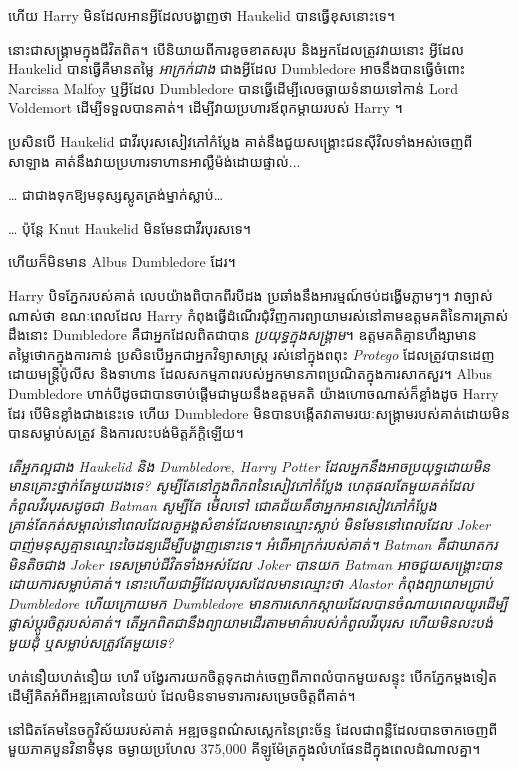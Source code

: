 ហើយ Harry មិនដែលអានអ្វីដែលបង្ហាញថា Haukelid បានធ្វើខុសនោះទេ។

នោះជាសង្រ្គាមក្នុងជីវិតពិត។ បើនិយាយពីការខូចខាតសរុប និងអ្នកដែលត្រូវវាយនោះ អ្វីដែល Haukelid បានធ្វើគឺមានតម្លៃ \emph{ អាក្រក់ជាង } ជាងអ្វីដែល Dumbledore អាចនឹងបានធ្វើចំពោះ Narcissa Malfoy ឬអ្វីដែល Dumbledore បានធ្វើដើម្បីលេចធ្លាយទំនាយទៅកាន់ Lord Voldemort ដើម្បីទទួលបានគាត់។ ដើម្បីវាយប្រហារឪពុកម្តាយរបស់ Harry ។

ប្រសិនបើ Haukelid ជាវីរបុរសសៀវភៅកំប្លែង គាត់នឹងជួយសង្គ្រោះជនស៊ីវិលទាំងអស់ចេញពីសាឡាង គាត់នឹងវាយប្រហារទាហានអាល្លឺម៉ង់ដោយផ្ទាល់...

… ជាជាងទុកឱ្យមនុស្សស្លូតត្រង់ម្នាក់ស្លាប់…

… ប៉ុន្តែ Knut Haukelid មិនមែនជាវីរបុរសទេ។

ហើយក៏មិនមាន Albus Dumbledore ដែរ។

Harry បិទភ្នែករបស់គាត់ លេបយ៉ាងពិបាកពីរបីដង ប្រឆាំងនឹងអារម្មណ៍ថប់ដង្ហើមភ្លាមៗ។ វាច្បាស់ណាស់ថា ខណៈពេលដែល Harry កំពុងធ្វើដំណើរជុំវិញការព្យាយាមរស់នៅតាមឧត្តមគតិនៃការត្រាស់ដឹងនោះ Dumbledore គឺជាអ្នកដែលពិតជាបាន \emph{ប្រយុទ្ធក្នុងសង្គ្រាម}។ ឧត្តមគតិគ្មានហឹង្សាមានតម្លៃថោកក្នុងការកាន់ ប្រសិនបើអ្នកជាអ្នកវិទ្យាសាស្ត្រ រស់នៅក្នុងពពុះ \emph{Protego} ដែលត្រូវបានដេញដោយមន្ត្រីប៉ូលីស និងទាហាន ដែលសកម្មភាពរបស់អ្នកមានភាពប្រណិតក្នុងការសាកសួរ។ Albus Dumbledore ហាក់បីដូចជាបានចាប់ផ្តើមជាមួយនឹងឧត្តមគតិ យ៉ាងហោចណាស់ក៏ខ្លាំងដូច Harry ដែរ បើមិនខ្លាំងជាងនេះទេ ហើយ Dumbledore មិន​បាន​បង្កើត​វា​តាម​រយៈ​សង្រ្គាម​របស់​គាត់​ដោយ​មិន​បាន​សម្លាប់​សត្រូវ និង​ការ​លះបង់​មិត្តភ័ក្ដិ​ឡើយ។

\emph{តើអ្នកល្អជាង Haukelid និង Dumbledore, Harry Potter ដែលអ្នកនឹងអាចប្រយុទ្ធដោយមិនមានគ្រោះថ្នាក់តែមួយដងទេ? សូម្បីតែនៅក្នុងពិភពនៃសៀវភៅកំប្លែង ហេតុផលតែមួយគត់ដែលកំពូលវីរបុរសដូចជា Batman សូម្បីតែ \emph{មើលទៅ} ជោគជ័យគឺថាអ្នកអានសៀវភៅកំប្លែងគ្រាន់តែកត់សម្គាល់នៅពេលដែលតួអង្គសំខាន់ដែលមានឈ្មោះស្លាប់ មិនមែននៅពេលដែល Joker បាញ់មនុស្សគ្មានឈ្មោះចៃដន្យដើម្បីបង្ហាញនោះទេ។ អំពើអាក្រក់របស់គាត់។ Batman គឺជាឃាតករមិនតិចជាង Joker ទេសម្រាប់ជីវិតទាំងអស់ដែល Joker បានយក Batman អាចជួយសង្គ្រោះបានដោយការសម្លាប់គាត់។ នោះហើយជាអ្វីដែលបុរសដែលមានឈ្មោះថា Alastor កំពុងព្យាយាមប្រាប់ Dumbledore ហើយក្រោយមក Dumbledore មានការសោកស្ដាយដែលបានចំណាយពេលយូរដើម្បីផ្លាស់ប្តូរចិត្តរបស់គាត់។ តើ​អ្នក​ពិត​ជា​នឹង​ព្យាយាម​ដើរ​តាម​មាគ៌ា​របស់​កំពូល​វីរបុរស ហើយ​មិន​លះបង់​មួយ​ដុំ ឬ​សម្លាប់​សត្រូវ​តែ​មួយ​ទេ?}

ហត់នឿយហត់នឿយ ហេរី បង្វែរការយកចិត្តទុកដាក់ចេញពីភាពលំបាកមួយសន្ទុះ បើកភ្នែកម្តងទៀតដើម្បីគិតអំពីអឌ្ឍគោលនៃយប់ ដែលមិនទាមទារការសម្រេចចិត្តពីគាត់។

នៅជិតគែមនៃចក្ខុវិស័យរបស់គាត់ អឌ្ឍចន្ទពណ៌សស្លេកនៃព្រះច័ន្ទ ដែលជាពន្លឺដែលបានចាកចេញពីមួយភាគបួនវិនាទីមុន ចម្ងាយប្រហែល 375,000 គីឡូម៉ែត្រក្នុងលំហផែនដីក្នុងពេលដំណាលគ្នា។

